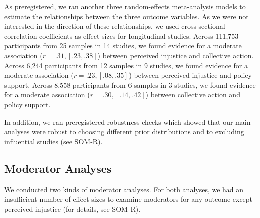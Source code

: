 \documentclass[12pt, letterpaper]{article}
\begin{document}
As preregistered, we ran another three random-effects meta-analysis
models to estimate the relationships between the three outcome
variables. As we were not interested in the direction of these
relationships, we used cross-sectional correlation coefficients as
effect sizes for longitudinal studies. Across 111,753 participants from
25 samples in 14 studies, we found evidence for a moderate association
(\(r = .31, [.23, .38]\)) between perceived injustice and collective
action. Across 6,244 participants from 12 samples in 9 studies, we found
evidence for a moderate association (\(r = .23, [.08, .35]\)) between
perceived injustice and policy support. Across 8,558 participants from 6
samples in 3 studies, we found evidence for a moderate association
(\(r = .30, [.14, .42]\)) between collective action and policy support.

In addition, we ran preregistered robustness checks which showed that
our main analyses were robust to choosing different prior distributions
and to excluding influential studies (see SOM-R).

\hypertarget{moderator-analyses}{%
\subsection{Moderator Analyses}\label{moderator-analyses}}

We conducted two kinds of moderator analyses. For both analyses, we had
an insufficient number of effect sizes to examine moderators for any
outcome except perceived injustice (for details, see SOM-R).
\end{document}
